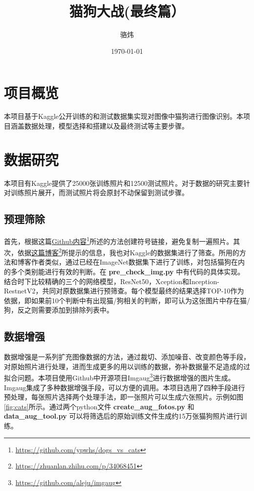 \documentclass[a4paper,11pt]{article}
\author{骆炜}
\date{\today}
\title{猫狗大战(最终篇）}
\begin{document}
\maketitle
\tableofcontents


\section{项目概览}
\label{sec:org964cc8f}
本项目基于Kaggle公开训练的和测试数据集实现对图像中猫狗进行图像识别。本项目涵盖数据处理，模型选择和搭建以及最终测试等主要步骤。
\section{数据研究}
\label{sec:org8f0ac97}
本项目有Kaggle提供了25000张训练照片和12500测试照片。对于数据的研究主要针对训练照片展开，而测试照片将会原封不动保留到测试步骤。
\subsection{预理筛除}
\label{sec:orgadcee09}
首先，根据这篇\href{https://github.com/ypwhs/dogs\_vs\_cats}{Github内容}\footnote{\url{https://github.com/ypwhs/dogs\_vs\_cats}}所述的方法创建符号链接，避免复制一遍照片。其次，依据\href{https://zhuanlan.zhihu.com/p/34068451}{这篇博客}\footnote{\url{https://zhuanlan.zhihu.com/p/34068451}}所提示的信息，我也对Kaggle的数据集进行了筛查。所用的方法和博客作者类似，通过已经在ImageNet数据集下进行了训练，对包括猫狗在内的多个类别能进行有效的判断。在 \textbf{pre\_check\_img.py} 中有代码的具体实现。结合时下比较精确的三个的网络模型，ResNet50，Xception和Inception-RestnetV2，共同对原数据集进行预筛查。每个模型最终的结果选择TOP-10作为依据，即如果前10个判断中有出现猫/狗相关的判断，即可认为这张图片中存在猫/狗，反之则需要添加到排除列表中。  

\subsection{数据增强}
\label{sec:orgd93702f}
数据增强是一系列扩充图像数据的方法，通过裁切、添加噪音、改变颜色等手段，对原始照片进行处理，进而生成更多的用以训练的数据，弥补数据量不足造成的过拟合问题。本项目使用Github中开源项目Imgaug\footnote{\url{https://github.com/aleju/imgaug}}进行数据增强的图片生成。Imgaug集成了多种数据增强手段，可以方便的调用。本项目选用了四种手段进行预处理，每张照片选择两个处理手法，即一张照片可以生成六张照片。示例如图\ref{fig:cats}所示。通过两个python文件 \textbf{create\_aug\_fotos.py} 和 \textbf{data\_aug\_tool.py} 可以将筛选后的原始训练文件生成约15万张猫狗照片进行训练。
\end{document}
